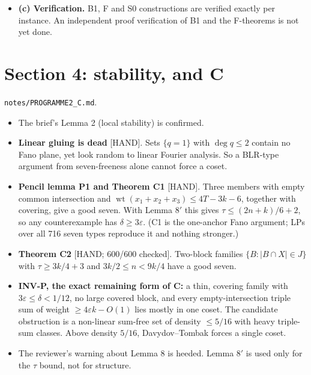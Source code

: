 \documentclass[11pt]{article}
\newcommand{\lvl}[1]{\textsf{\small[#1]}}
\begin{document}
\begin{itemize}
\begin{itemize}
  \item (i) is moot (the range is empty). For $N\ge11/6$, $\Omega$'s with empty common intersection reach $N<1.909$, and
  S1 reaches $1.9385$. Nothing is proved above.
  \item (ii), codimension above $0.09k$ with no short dual words: open. ``Such families do not exist'' is false. What is
  missing is a bound on the number of dual words of medium weight.
  \end{itemize}
\item \textbf{(c) Verification.} B1, F and S0 constructions are verified exactly per instance. An independent proof
verification of B1 and the F-theorems is not yet done.
\end{itemize}

\section{Section 4: stability, and C}
\texttt{notes/PROGRAMME2\_C.md}.
\begin{itemize}
\item The brief's Lemma 2 (local stability) is confirmed.
\item \textbf{Linear gluing is dead} \lvl{HAND}. Sets $\{q=1\}$ with $\deg q\le2$ contain no Fano plane, yet look random to
linear Fourier analysis. So a BLR-type argument from seven-freeness alone cannot force a coset.
\item \textbf{Pencil lemma P1 and Theorem C1} \lvl{HAND}. Three members with empty common intersection and
$\operatorname{wt}(x_1+x_2+x_3)\le4T-3k-6$, together with covering, give a good seven. With Lemma $8'$ this gives
$\tau\le(2n+k)/6+2$, so any counterexample has $\delta\ge3\varepsilon$. (C1 is the one-anchor Fano argument; LPs over all 716
seven types reproduce it and nothing stronger.)
\item \textbf{Theorem C2} \lvl{HAND; 600/600 checked}. Two-block families $\{B:|B\cap X|\in J\}$ with $\tau\ge3k/4+3$ and
$3k/2\le n<9k/4$ have a good seven.
\item \textbf{INV-P, the exact remaining form of C:} a thin, covering family with $3\varepsilon\le\delta<1/12$, no large
covered block, and every empty-intersection triple sum of weight $\ge4\varepsilon k-O(1)$ lies mostly in one coset. The
candidate obstruction is a non-linear sum-free set of density $\le5/16$ with heavy triple-sum classes. Above density $5/16$,
Davydov--Tombak forces a single coset.
\item The reviewer's warning about Lemma 8 is heeded. Lemma $8'$ is used only for the $\tau$ bound, not for structure.
\end{itemize}
\end{document}
